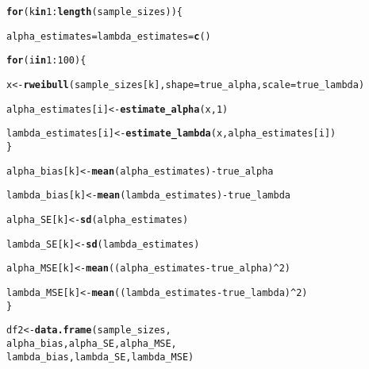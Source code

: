 \documentclass[11pt, a4paper]{article}\usepackage[]{graphicx}\usepackage[]{xcolor}
\makeatletter
\newcommand{\hlnum}[1]{\textcolor[rgb]{0.686,0.059,0.569}{#1}}%
\newcommand{\hlopt}[1]{\textcolor[rgb]{0,0,0}{#1}}%
\newcommand{\hldef}[1]{\textcolor[rgb]{0.345,0.345,0.345}{#1}}%
\newcommand{\hlkwa}[1]{\textcolor[rgb]{0.161,0.373,0.58}{\textbf{#1}}}%
\newcommand{\hlkwb}[1]{\textcolor[rgb]{0.69,0.353,0.396}{#1}}%
\newcommand{\hlkwc}[1]{\textcolor[rgb]{0.333,0.667,0.333}{#1}}%
\newcommand{\hlkwd}[1]{\textcolor[rgb]{0.737,0.353,0.396}{\textbf{#1}}}%
\newenvironment{kframe}{%
 \def\at@end@of@kframe{}%
 \ifinner\ifhmode%
  \def\at@end@of@kframe{\end{minipage}}%
  \begin{minipage}{\columnwidth}%
 \fi\fi%
 \def\FrameCommand##1{\hskip\@totalleftmargin \hskip-\fboxsep
 \colorbox{shadecolor}{##1}\hskip-\fboxsep
     \hskip-\linewidth \hskip-\@totalleftmargin \hskip\columnwidth}%
 \MakeFramed {\advance\hsize-\width
   \@totalleftmargin\z@ \linewidth\hsize
   \@setminipage}}%
 {\par\unskip\endMakeFramed%
 \at@end@of@kframe}
\newenvironment{knitrout}{}{} %
\makeatother
\begin{document}
\begin{knitrout}
\color{fgcolor}\begin{kframe}
\begin{alltt}
\hlkwa{for} \hldef{(k} \hlkwa{in} \hlnum{1}\hlopt{:}\hlkwd{length}\hldef{(sample_sizes)) \{}

  \hldef{alpha_estimates} \hlkwb{=} \hldef{lambda_estimates} \hlkwb{=} \hlkwd{c}\hldef{()}

  \hlkwa{for} \hldef{(i} \hlkwa{in} \hlnum{1}\hlopt{:}\hlnum{100}\hldef{)\{}

    \hldef{x} \hlkwb{<-} \hlkwd{rweibull}\hldef{(sample_sizes[k],} \hlkwc{shape} \hldef{= true_alpha,} \hlkwc{scale} \hldef{= true_lambda)}

    \hldef{alpha_estimates[i]} \hlkwb{<-} \hlkwd{estimate_alpha}\hldef{(x,} \hlnum{1}\hldef{)}

    \hldef{lambda_estimates[i]} \hlkwb{<-} \hlkwd{estimate_lambda}\hldef{(x, alpha_estimates[i])}
  \hldef{\}}

  \hldef{alpha_bias[k]} \hlkwb{<-} \hlkwd{mean}\hldef{(alpha_estimates)} \hlopt{-} \hldef{true_alpha}

  \hldef{lambda_bias[k]} \hlkwb{<-} \hlkwd{mean}\hldef{(lambda_estimates)} \hlopt{-} \hldef{true_lambda}

  \hldef{alpha_SE[k]} \hlkwb{<-} \hlkwd{sd}\hldef{(alpha_estimates)}

  \hldef{lambda_SE[k]} \hlkwb{<-} \hlkwd{sd}\hldef{(lambda_estimates)}

  \hldef{alpha_MSE[k]} \hlkwb{<-} \hlkwd{mean}\hldef{( (alpha_estimates} \hlopt{-} \hldef{true_alpha)}\hlopt{^}\hlnum{2} \hldef{)}

  \hldef{lambda_MSE[k]} \hlkwb{<-} \hlkwd{mean}\hldef{( (lambda_estimates} \hlopt{-} \hldef{true_lambda)}\hlopt{^}\hlnum{2} \hldef{)}
\hldef{\}}
\end{alltt}
\end{kframe}
\end{knitrout}

\begin{knitrout}
\color{fgcolor}\begin{kframe}
\begin{alltt}
\hldef{df2} \hlkwb{<-} \hlkwd{data.frame}\hldef{(sample_sizes,}
                  \hldef{alpha_bias, alpha_SE, alpha_MSE,}
                  \hldef{lambda_bias, lambda_SE, lambda_MSE)}
\end{alltt}
\end{kframe}
\end{knitrout}
\end{document}
